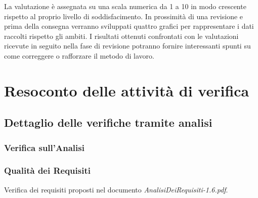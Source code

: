 La valutazione \`e assegnata su una scala numerica da 1 a 10 in modo crescente
rispetto al proprio livello di soddisfacimento.
In prossimit\`a di una revisione e prima della consegna verranno sviluppati
quattro grafici per rappresentare i dati raccolti rispetto gli ambiti. 
I risultati ottenuti confrontati con le valutazioni ricevute in seguito nella
fase di revisione potranno fornire interessanti spunti su come correggere o
rafforzare il metodo di lavoro.




\chapter{Resoconto delle attivit\`a di verifica}
\thispagestyle{fancy} %

\section{Dettaglio delle verifiche tramite analisi}

\subsection{Verifica sull'Analisi}

\subsection*{Qualit\`a dei Requisiti}

Verifica dei requisiti proposti nel documento
\emph{AnalisiDeiRequisiti-1.6.pdf}.

